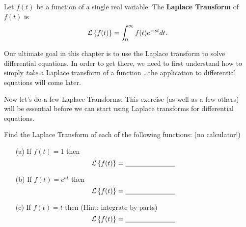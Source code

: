 \begin{definition}
    Let $f(t)$ be a function of a single real variable.  The {\bf Laplace Transform} of
    $f(t)$ is 
    \[ \mathcal{L}\left\{ f(t) \right\} = \int_0^\infty f(t) e^{-st} dt. \]
\end{definition}

Our ultimate goal in this chapter is to use the Laplace transform to solve differential
equations.  In order to get there, we need to first understand how to simply {\it take} a
Laplace transform of a function \ldots the application to differential equations will come
later.

Now let's do a few Laplace Transforms.  This exercise (as well as a few others) will be
essential before we can start using Laplace transforms for differential equations.

\begin{problem}
    Find the Laplace Transform of each of the following functions: (no calculator!)
    \begin{enumerate}
        \item[(a)] If $f(t) = 1$ then
            \[ \mathcal{L}\left\{ f(t) \right\} = \underline{\hspace{1in}} \]
            \solution{
                \[ \int_0^\infty e^{-st} \cdot 1 dt = -\frac{e^{-st}}{s}
                    \Big|_{t=0}^{t\to\infty} =
                    \lim_{b \to \infty} -\frac{e^{-st}}{s} \Big|_{t=0}^{t=b} = - \left(
                    \lim_{b \to \infty} \frac{e^{-sb}}{s} - \frac{1}{s}
                \right) = \frac{1}{s} \]
            }
        \item[(b)] If $f(t) = e^{at}$ then
            \[ \mathcal{L}\left\{ f(t) \right\} = \underline{\hspace{1in}} \]
            \solution{
                \[ \int_0^\infty e^{-st} e^{at} dt = \int_0^\infty e^{-(s-a)t} dt = \cdots =
                \frac{1}{s-a} \]
            }
        \item[(c)] If $f(t) = t$ then (Hint: integrate by parts)
            \[ \mathcal{L}\left\{ f(t) \right\} = \underline{\hspace{1in}} \]
            \solution{
                \[ \int_0^\infty te^{-st} dt = -\frac{te^{-st}}{s} \Big|_{t=0}^{t \to \infty} -
                    \int_0^\infty -\frac{e^{-st}}{s} dt = \frac{1}{s} \int_0^\infty
                    e^{-st} dt = \frac{1}{s} \lap{1} = \frac{1}{s^2} \]
            }
    \end{enumerate}
\end{problem}

